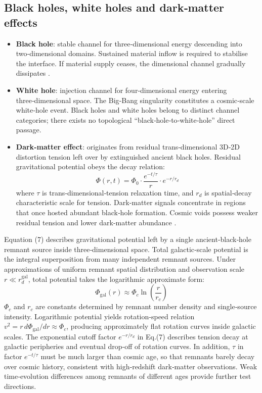 \documentclass[12pt,a4paper]{article}
\begin{document}
\subsection{Black holes, white holes and dark‑matter effects}
\begin{itemize}
\item \textbf{Black hole}: stable channel for three‑dimensional energy descending into two‑dimensional domains. Sustained material inflow is required to stabilise the interface. If material supply ceases, the dimensional channel gradually dissipates \cite{hawking1974,chandrasekhar1983}.
\item \textbf{White hole}: injection channel for four‑dimensional energy entering three‑dimensional space. The Big‑Bang singularity constitutes a cosmic‑scale white‑hole event. Black holes and white holes belong to distinct channel categories; there exists no topological ``black‑hole‑to‑white‑hole'' direct passage.
\item \textbf{Dark‑matter effect}: originates from residual trans‑dimensional 3D‑2D distortion tension left over by extinguished ancient black holes. Residual gravitational potential obeys the decay relation:
\begin{equation}
\Phi(r,t)=\Phi_0 \cdot \frac{e^{-t/\tau}}{r}\cdot e^{-r/r_d}
\end{equation}
where $\tau$ is trans‑dimensional‑tension relaxation time, and $r_d$ is spatial‑decay characteristic scale for tension. Dark‑matter signals concentrate in regions that once hosted abundant black‑hole formation. Cosmic voids possess weaker residual tension and lower dark‑matter abundance \cite{rubin1980,bertone2005}.
\end{itemize}

Equation (7) describes gravitational potential left by a single ancient‑black‑hole remnant source inside three‑dimensional space. Total galactic‑scale potential is the integral superposition from many independent remnant sources. Under approximations of uniform remnant spatial distribution and observation scale $r\ll r_d^{\text{gal}}$, total potential takes the logarithmic approximate form:
\begin{equation*}
\Phi_{\text{gal}}(r)\approx\Phi_c \ln\left(\frac{r}{r_c}\right)
\tag{7b}
\end{equation*}
$\Phi_c$ and $r_c$ are constants determined by remnant number density and single‑source intensity. Logarithmic potential yields rotation‑speed relation $v^2 = r\,d\Phi_{\text{gal}}/dr \approx \Phi_c$, producing approximately flat rotation curves inside galactic scales. The exponential cutoff factor $e^{-r/r_d}$ in Eq.(7) describes tension decay at galactic peripheries and eventual drop‑off of rotation curves. In addition, $\tau$ in factor $e^{-t/\tau}$ must be much larger than cosmic age, so that remnants barely decay over cosmic history, consistent with high‑redshift dark‑matter observations. Weak time‑evolution differences among remnants of different ages provide further test directions.
\end{document}
